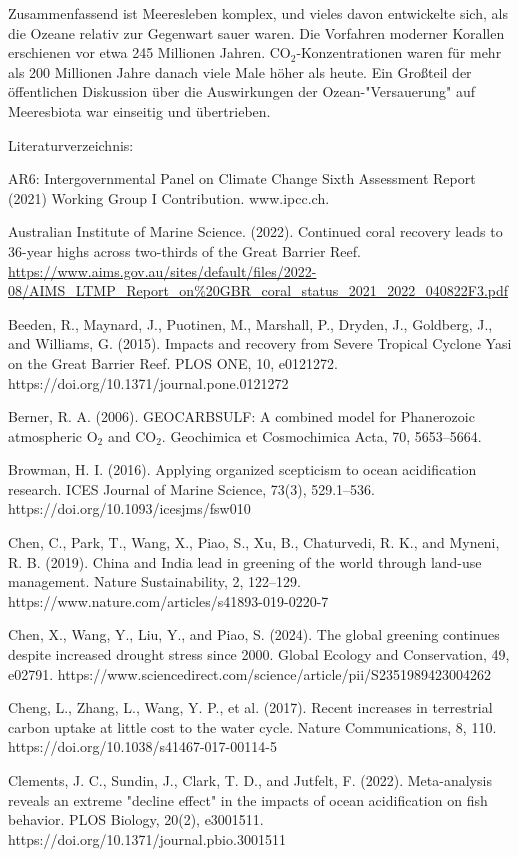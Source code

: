 \documentclass[12pt,paper=a4,DIV=12,parskip=never,chapterprefix=false,headings=standardclasses]{scrreprt}
\numberwithin{figure}{chapter}
\begin{document}
Zusammenfassend ist Meeresleben komplex, und vieles davon entwickelte sich, als die Ozeane relativ zur Gegenwart sauer waren. Die Vorfahren moderner Korallen erschienen vor etwa 245 Millionen Jahren. CO$_2$-Konzentrationen waren für mehr als 200 Millionen Jahre danach viele Male höher als heute. Ein Großteil der öffentlichen Diskussion über die Auswirkungen der Ozean-"Versauerung" auf Meeresbiota war einseitig und übertrieben.

\vfill
Literaturverzeichnis:

AR6: Intergovernmental Panel on Climate Change Sixth Assessment Report (2021) Working Group I Contribution. www.ipcc.ch.

Australian Institute of Marine Science. (2022). Continued coral recovery leads to 36-year highs across two-thirds of the Great Barrier Reef. \url{https://www.aims.gov.au/sites/default/files/2022-08/AIMS_LTMP_Report_on\%20GBR_coral_status_2021_2022_040822F3.pdf}

Beeden, R., Maynard, J., Puotinen, M., Marshall, P., Dryden, J., Goldberg, J., and Williams, G. (2015). Impacts and recovery from Severe Tropical Cyclone Yasi on the Great Barrier Reef. PLOS ONE, 10, e0121272. https://doi.org/10.1371/journal.pone.0121272

Berner, R. A. (2006). GEOCARBSULF: A combined model for Phanerozoic atmospheric O$_2$ and CO$_2$. Geochimica et Cosmochimica Acta, 70, 5653–5664.

Browman, H. I. (2016). Applying organized scepticism to ocean acidification research. ICES Journal of Marine Science, 73(3), 529.1–536. https://doi.org/10.1093/icesjms/fsw010

Chen, C., Park, T., Wang, X., Piao, S., Xu, B., Chaturvedi, R. K., and Myneni, R. B. (2019). China and India lead in greening of the world through land-use management. Nature Sustainability, 2, 122–129. https://www.nature.com/articles/s41893-019-0220-7

Chen, X., Wang, Y., Liu, Y., and Piao, S. (2024). The global greening continues despite increased drought stress since 2000. Global Ecology and Conservation, 49, e02791. https://www.sciencedirect.com/science/article/pii/S2351989423004262

Cheng, L., Zhang, L., Wang, Y. P., et al. (2017). Recent increases in terrestrial carbon uptake at little cost to the water cycle. Nature Communications, 8, 110. https://doi.org/10.1038/s41467-017-00114-5

Clements, J. C., Sundin, J., Clark, T. D., and Jutfelt, F. (2022). Meta-analysis reveals an extreme "decline effect" in the impacts of ocean acidification on fish behavior. PLOS Biology, 20(2), e3001511. https://doi.org/10.1371/journal.pbio.3001511
\end{document}
